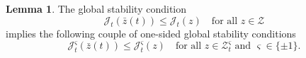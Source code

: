 \documentclass[a4paper,10pt,oneside]{amsbook}
\numberwithin{section}{chapter}
\numberwithin{equation}{chapter}
\theoremstyle{definition}
\newtheorem{lemma}[prop]{Lemma}
\newtheorem{rmk}[prop]{Remark}
\DeclarePairedDelimiter{\dual}{\langle}{\rangle}
\begin{document}
\begin{lemma}
The global stability condition
\begin{equation}
\label{eqn:min-neck}
\mathcal{J}_t(\bar{z}(t))\le\mathcal{J}_t(z)\quad\text{for all $z\in\mathscr{Z}$}
\end{equation}
implies the following couple of one-sided  global stability conditions
\begin{equation}
\label{eqn:min-neck-sigma}
\mathcal{J}_t^\varsigma(\bar{z}(t))\le\mathcal{J}_t^\varsigma(z)\quad\text{for all $z\in\mathscr{Z}^\varsigma_t$ and $\varsigma\in\{\pm1\}$}.
\end{equation}
\end{lemma}
\end{document}
